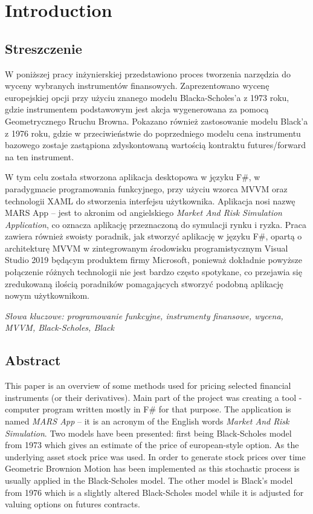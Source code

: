 \chapter{Introduction}
\section{Streszczenie}
    W poniższej pracy inżynierskiej przedstawiono proces tworzenia narzędzia do wyceny wybranych instrumentów finansowych. Zaprezentowano wycenę europejskiej opcji przy użyciu znanego modelu Blacka-Scholes'a z 1973 roku, gdzie instrumentem podstawowym jest akcja wygenerowana za pomocą Geometrycznego Rruchu Browna. Pokazano również zastosowanie modelu Black'a z 1976 roku, gdzie w przeciwieństwie do poprzedniego modelu cena instrumentu bazowego zostaje zastąpiona zdyskontowaną wartością kontraktu futures/forward na ten instrument.
    
    W tym celu została stworzona aplikacja desktopowa w języku F\#, w paradygmacie programowania funkcyjnego, przy użyciu wzorca MVVM oraz technologii XAML do stworzenia interfejsu użytkownika. Aplikacja nosi nazwę MARS App -- jest to akronim od angielskiego \textit{Market And Risk Simulation Application}, co oznacza aplikację przeznaczoną do symulacji rynku i ryzka. Praca zawiera również swoisty poradnik, jak stworzyć aplikację w języku F\#, opartą o architekturę MVVM w zintegrowanym środowisku programistycznym Visual Studio 2019 będącym produktem firmy Microsoft, ponieważ dokładnie powyższe połączenie różnych technologii nie jest bardzo często spotykane, co przejawia się zredukowaną ilością poradników pomagających stworzyć podobną aplikację nowym użytkownikom.
    
    \emph{Słowa kluczowe: programowanie funkcyjne, instrumenty finansowe, wycena, MVVM, Black-Scholes, Black}

\section{Abstract}
    This paper is an overview of some methods used for pricing selected financial instruments (or their derivatives). Main part of the project was creating a tool - computer program written mostly in F\# for that purpose. The application is named \textit{MARS App} -- it is an acronym  of the English words \textit{Market And Risk Simulation}. Two models have been presented: first being Black-Scholes model from 1973 which gives an estimate of the price of european-style option. As the underlying asset stock price was used. In order to generate stock prices over time Geometric Brownion Motion has been implemented as this stochastic process is usually applied in the Black-Scholes model. The other model is Black's model from 1976 which is a slightly altered Black-Scholes model while it is adjusted for valuing options on futures contracts.
    
